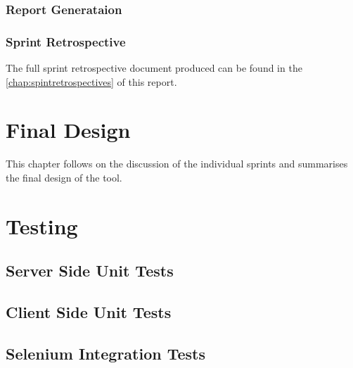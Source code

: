 \subsection{Report Generataion}


\subsection{Sprint Retrospective}
The full sprint retrospective document produced can be found in the
\autoref{chap:spintretrospectives} of this report.

\chapter{Final Design}

This chapter follows on the discussion of the individual sprints and summarises
the final design of the tool.

\chapter{Testing}

\section{Server Side Unit Tests}
\section{Client Side Unit Tests}
\section{Selenium Integration Tests}

